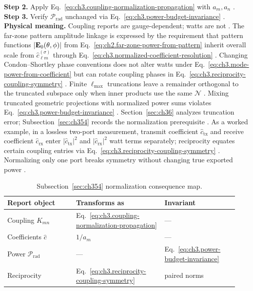 \textbf{Step 2.} Apply Eq.~\eqref{eq:ch3.coupling-normalization-propagation} with \(a_{m},a_{n}\) \cite{hansen1988}.
\textbf{Step 3.} Verify \(\mathcal{P}_{\mathrm{rad}}\) unchanged via Eq.~\eqref{eq:ch3.power-budget-invariance}
\cite{poynting1884}.
\textbf{Physical meaning.} Coupling reports are gauge-dependent; watts are not \cite{stratton1941}.
The far-zone pattern amplitude linkage is expressed by the requirement that pattern functions \(|\mathbf{E}_{0}(\theta,\phi)|\) from Eq.~\eqref{eq:ch2.far-zone-power-from-pattern} inherit overall scale from
\(\widehat{c}_{\ell m}^{(\sigma)}\) through Eq.~\eqref{eq:ch3.normalized-coefficient-resolution}
\cite{stratton1941}. Changing Condon--Shortley phase conventions does not alter watts under
Eq.~\eqref{eq:ch3.mode-power-from-coefficient} but can rotate coupling phases in
Eq.~\eqref{eq:ch3.reciprocity-coupling-symmetry} \cite{hansen1988}.
Finite \(\ell_{\max}\) truncations leave a remainder orthogonal to the truncated subspace only when inner products use
the same \(\mathcal{N}\) \cite{hansen1988}. Mixing truncated geometric projections with normalized power
sums violates Eq.~\eqref{eq:ch3.power-budget-invariance} \cite{harrington2001}. Section~\ref{sec:ch36} analyzes
truncation error; Subsection~\ref{sec:ch354} records the normalization prerequisite \cite{stratton1941}.
As a worked example, in a lossless two-port measurement, transmit coefficient \(\widehat{c}_{\mathrm{tx}}\) and receive coefficient
\(\widehat{c}_{\mathrm{rx}}\) enter \(|\widehat{c}_{\mathrm{tx}}|^{2}\) and \(|\widehat{c}_{\mathrm{rx}}|^{2}\) watt
terms separately; reciprocity equates certain coupling entries via Eq.~\eqref{eq:ch3.reciprocity-coupling-symmetry}
\cite{stratton1941}. Normalizing only one port breaks symmetry without changing true exported power
\cite{harrington2001}.
\begin{table}[t]
\centering
\caption{Subsection~\ref{sec:ch354} normalization consequence map.}
\label{tab:ch3.354-consequence-map}
\small
\begin{tabular}{@{}p{0.28\linewidth}p{0.36\linewidth}p{0.30\linewidth}@{}}
\toprule
Report object & Transforms as & Invariant \\
\midrule
Coupling \(K_{mn}\) & Eq.~\eqref{eq:ch3.coupling-normalization-propagation} & --- \\
Coefficients \(\widehat{c}\) & \(1/a_{m}\) & --- \\
Power \(\mathcal{P}_{\mathrm{rad}}\) & --- & Eq.~\eqref{eq:ch3.power-budget-invariance} \\
Reciprocity & Eq.~\eqref{eq:ch3.reciprocity-coupling-symmetry} & paired norms \\
\bottomrule
\end{tabular}
\end{table}
